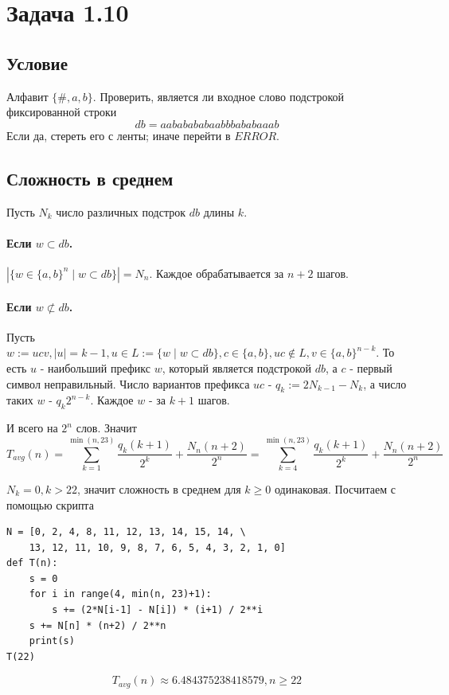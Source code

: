 \documentclass[12pt]{article}
\begin{document}
\section*{Задача 1.10}

\subsection*{Условие} Алфавит $\{\#,a,b\}$. Проверить, является ли входное слово
подстрокой фиксированной строки
\[
db=aababababaabbbababaaab
\]
Если да, стереть его с ленты; иначе перейти в $ERROR$.

\subsection*{Сложность в среднем}

Пусть $N_k$ число различных подстрок $db$ длины $k$.

\paragraph{Если $w \subset db$.}
$|\{w \in \{a,b\}^n \mid w \subset db\}| = N_n$.
Каждое обрабатывается за $n+2$ шагов.

\paragraph{Если $w \not\subset db$.}
Пусть $w:=ucv, |u|=k-1, u\in L:=\{w \mid w \subset db\}
, c\in\{a,b\}, uc\notin L, v\in\{a,b\}^{n-k}$.
То есть $u$ - наибольший префикс $w$, который является подстрокой $db$,
а $c$ - первый символ неправильный.
Число вариантов префикса $uc$ -
$q_k:=2N_{k-1}-N_k$, а число таких $w$ - $q_k2^{n-k}$.
Каждое $w$ - за $k+1$ шагов.

И всего на $2^n$ слов. Значит
\[
T_{avg}(n)=
\sum_{k=1}^{\min(n,23)}\frac{q_k(k+1)}{2^k}
+\frac{N_n(n+2)}{2^n} = \sum_{k=4}^{\min(n,23)}\frac{q_k(k+1)}{2^k}
+\frac{N_n(n+2)}{2^n}
\]

$N_k=0, k>22$, значит сложность в среднем для $k\ge 0$ одинаковая.
Посчитаем с помощью скрипта

\begin{verbatim}
N = [0, 2, 4, 8, 11, 12, 13, 14, 15, 14, \
    13, 12, 11, 10, 9, 8, 7, 6, 5, 4, 3, 2, 1, 0]
def T(n):
    s = 0
    for i in range(4, min(n, 23)+1):
        s += (2*N[i-1] - N[i]) * (i+1) / 2**i
    s += N[n] * (n+2) / 2**n
    print(s)
T(22)
\end{verbatim}

\[
T_{avg}(n)\approx 6.484375238418579, n\geq22
\]
\end{document}
